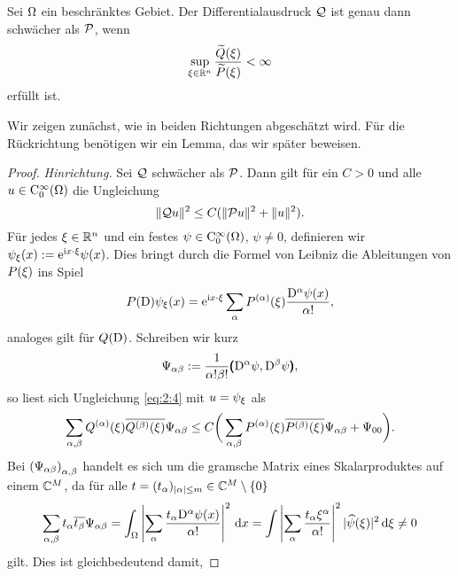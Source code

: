 \begin{thm}\label{thm:2:2.1}
Sei $\Omega$ ein beschränktes Gebiet.
Der Differentialausdruck $\mathcal Q$ ist genau dann schwächer als $\mathcal P$,
wenn
\begin{equation}\label{eq:thm:2:2.1}
\sup_{\xi\in\mathbb R^n}\frac{\widetilde{Q}(\xi)}{\widetilde{P}(\xi)}<\infty
\end{equation}
erfüllt ist.
\end{thm}

Wir zeigen zunächst, wie in beiden Richtungen abgeschätzt wird.
Für die Rückrichtung benötigen wir ein Lemma,
das wir später beweisen.

\begin{proof}
{\em Hinrichtung.}
Sei $\mathcal Q$ schwächer als $\mathcal P$.
Dann gilt für ein $C>0$ und alle $u\in\mathrm C_0^\infty(\Omega)$ die Ungleichung
\begin{equation}\label{eq:2:4}
\lVert\mathcal Q u\rVert^2\leq C(\lVert\mathcal P u\rVert^2+\lVert u\rVert^2).
\end{equation}
Für jedes $\xi\in\mathbb R^n$ und ein festes $\psi\in \mathrm C^\infty_0(\Omega)$, $\psi\neq0$,
definieren wir $\psi_\xi(x):=\mathrm e^{\mathrm i x\cdot\xi}\psi(x)$.
Dies bringt durch die Formel von Leibniz die Ableitungen von $P(\xi)$ ins Spiel
\begin{equation}\label{eq:2.5}
P(\mathrm D)\psi_\xi(x)=\mathrm e^{\mathrm i x\cdot\xi}\sum_\alpha P^{(\alpha)}(\xi)\frac{\mathrm D^\alpha\psi(x)}{\alpha!},
\end{equation}
analoges gilt für $Q(\mathrm D)$.
Schreiben wir kurz
\begin{equation}\label{eq:2.6}
\Psi_{\alpha\beta}:=\frac1{\alpha!\beta!}\pmb(\mathrm D^\alpha\psi,\mathrm D^\beta\psi\pmb),
\end{equation}
so liest sich Ungleichung \eqref{eq:2:4} mit $u=\psi_\xi$ als
\begin{equation}\label{eq:2.7}
\sum_{\alpha,\beta}Q^{(\alpha)}(\xi)\overline{{Q}^{(\beta)}(\xi)}\Psi_{\alpha\beta}
\leq C\bigg(\sum_{\alpha,\beta}P^{(\alpha)}(\xi)\overline{{P}^{(\beta)}(\xi)}\Psi_{\alpha\beta}+\Psi_{00}\bigg).
\end{equation}
Bei $\left(\Psi_{\alpha\beta}\right)_{\alpha,\beta}$ handelt es sich um die gramsche Matrix
eines Skalarproduktes auf einem $\mathbb C^M$, da für alle $t=(t_\alpha)_{|\alpha|\le m}\in\mathbb C^M\setminus\{0\}$
\begin{equation}
  \sum_{\alpha,\beta} t_\alpha \overline{t_\beta} \Psi_{\alpha\beta} = \int_\Omega \left|\sum_\alpha \frac{t_\alpha \mathrm D^\alpha\psi (x)}{\alpha! }\right|^2 \,\mathrm d x 
  = \int \left|\sum_\alpha \frac{t_\alpha \xi^\alpha}{\alpha!} \right|^2 |\widehat\psi(\xi)|^2 \,\mathrm d\xi \ne0
\end{equation}
gilt.
Dies ist gleichbedeutend damit,

\end{proof}
